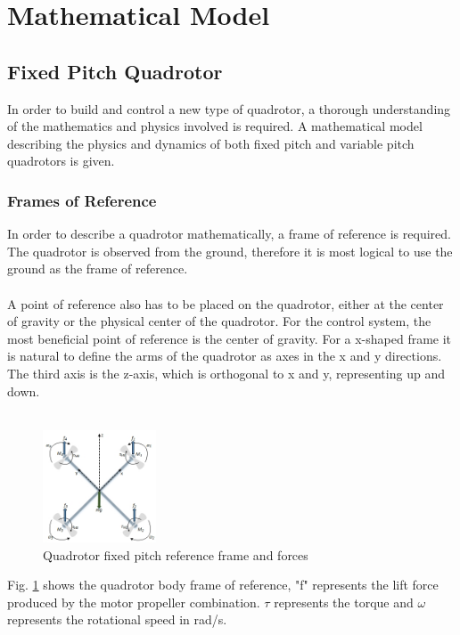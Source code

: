 \section{Mathematical Model}

\subsection{Fixed Pitch Quadrotor}

In order to build and control a new type of quadrotor, a thorough understanding of the mathematics and physics involved is required. A mathematical model describing the physics and dynamics of both fixed pitch and variable pitch quadrotors is given.

\subsubsection{Frames of Reference}
In order to describe a quadrotor mathematically, a frame of reference is required. The quadrotor is observed from the ground, therefore it is most logical to use the ground as the frame of reference.
\\\\
A point of reference also has to be placed on the quadrotor, either at the center of gravity or the physical center of the quadrotor. For the control system, the most beneficial point of reference is the center of gravity. For a x-shaped frame it is natural to define the arms of the quadrotor as axes in the x and y directions. The third axis is the z-axis, which is orthogonal to x and y, representing up and down. 
\\\\
\begin{figure}[H]
    \centering
    \includegraphics[width = 0.3\textwidth]{VAPIQ-PICTURES/MMFPQ.jpg}
    \caption{Quadrotor fixed pitch reference frame and forces}
    \label{fig:quadDynamics}
\end{figure}
\noindent
Fig. \ref{fig:quadDynamics} shows the quadrotor body frame of reference, "f" represents the lift force produced by the motor propeller combination. $\tau$ represents the torque and $\omega$ represents the rotational speed in rad/s.
